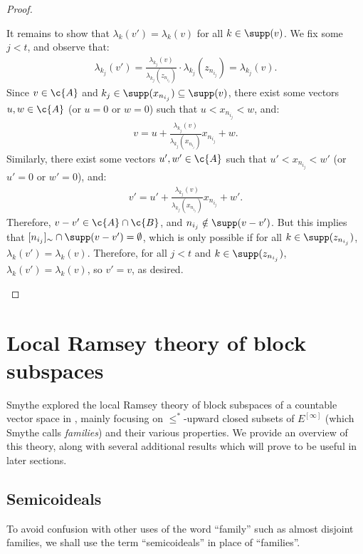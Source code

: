\documentclass[11pt,reqno]{amsart}
\begin{document}
\begin{proof}
\begin{midproof}
        It remains to show that $\lambda_k(v') = \lambda_k(v)$ for all $k \in \supp(v)$. We fix some $j < t$, and observe that:
        \begin{align*}
            \lambda_{k_j}(v') = \frac{\lambda_{k_j}(v)}{\lambda_{k_j}(z_{n_{i_j}})} \cdot \lambda_{k_j}(z_{n_{i_j}}) = \lambda_{k_j}(v).
        \end{align*}
        Since $v \in \c{A}$ and $k_j \in \supp(x_{n_{i_j}}) \subseteq \supp(v)$, there exist some vectors $u,w \in \c{A}$ (or $u = 0$ or $w = 0$) such that $u < x_{n_{i_j}} < w$, and:
        \begin{align*}
            v = u + \frac{\lambda_{k_j}(v)}{\lambda_{k_j}(x_{n_{i_j}})}x_{n_{i_j}} + w.
        \end{align*}
        Similarly, there exist some vectors $u',w' \in \c{A}$ such that $u' < x_{n_{i_j}} < w'$ (or $u' = 0$ or $w'      = 0$), and:
        \begin{align*}
            v' = u' + \frac{\lambda_{k_j}(v)}{\lambda_{k_j}(x_{n_{i_j}})}x_{n_{i_j}} + w'.
        \end{align*}
        Therefore, $v - v' \in \c{A} \cap \c{B}$, and $n_{i_j} \notin \supp(v - v')$. But this implies that $[n_{i_j}]_\sim \cap \supp(v - v') = \emptyset$, which is only possible if for all $k \in \supp(z_{n_{i_j}})$, $\lambda_k(v') = \lambda_k(v)$. Therefore, for all $j < t$ and $k \in \supp(z_{n_{i_j}})$, $\lambda_k(v') = \lambda_k(v)$, so $v' = v$, as desired.
    \end{midproof}
\end{proof}

\section{Local Ramsey theory of block subspaces}
\label{sec:local.ramsey.theory}
Smythe explored the local Ramsey theory of block subspaces of a countable vector space in \cite{S18}, mainly focusing on $\leq^*$-upward closed subsets of $E^{[\infty]}$ (which Smythe calls \emph{families}) and their various properties.  We provide an overview of this theory, along with several additional results which will prove to be useful in later sections.

\subsection{Semicoideals}
To avoid confusion with other uses of the word ``family'' such as almost disjoint families, we shall use the term ``semicoideals'' in place of ``families''.
\end{document}
